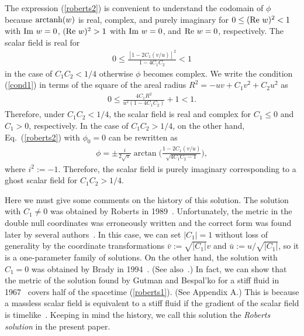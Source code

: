 \documentclass[aps,prd,twocolumn,eqsecnum,showpacs,amsmath]{revtex4}
\begin{document}
The expression (\ref{roberts2}) is convenient to understand the codomain of $\phi$ because ${\rm arctanh}(w)$ is real, complex, and purely imaginary for $0 \le ({\rm Re}~w)^2<1$ with ${\rm Im}~w=0$, $({\rm Re}~w)^2>1$ with ${\rm Im}~w=0$, and ${\rm Re}~w=0$, respectively.
The scalar field is real for 
\begin{eqnarray}
0 \le \frac{[1-2C_1(v/u)]^2}{1-4C_1C_2}<1 \label{cond1}
\end{eqnarray}
in the case of $C_1C_2<1/4$ otherwise $\phi$ becomes complex.
We write the condition (\ref{cond1}) in terms of the square of the areal radius $R^2=-uv+C_1v^2+C_2u^2$ as
\begin{eqnarray}
0 \le \frac{4C_1R^2}{u^2(1-4C_1C_2)}+1<1.
\end{eqnarray}
Therefore, under $C_1C_2<1/4$, the scalar field is real and complex for $C_1 \le 0$ and $C_1>0$, respectively.
In the case of $C_1C_2>1/4$, on the other hand, Eq.~(\ref{roberts2}) with $\phi_0=0$ can be rewritten as
\begin{eqnarray}
\phi=\pm \frac{i}{2\sqrt{\pi}}\arctan\biggl(\frac{1-2C_1(v/u)}{\sqrt{4C_1C_2-1}}\biggl), \label{roberts-c}
\end{eqnarray}
where $i^2:=-1$.
Therefore, the scalar field is purely imaginary corresponding to a ghost scalar field for $C_1C_2>1/4$.



Here we must give some comments on the history of this solution.
The solution with $C_1 \ne 0$ was obtained by Roberts in 1989~\cite{roberts1989}.
Unfortunately, the metric in the double null coordinates was erroneously written and the correct form was found later by several authors~\cite{sussman1991,ont1994,brady1994,burko1997}.
In this case, we can set $|C_1|=1$ without loss of generality by the coordinate transformations ${\bar v}:=\sqrt{|C_1|}v$ and ${\bar u}:=u/\sqrt{|C_1|}$, so it is a one-parameter family of solutions.
On the other hand, the solution with $C_1=0$ was obtained by Brady in 1994~\cite{brady1994}. (See also~\cite{hayward2000,ch2001}.)
In fact, we can show that the metric of the solution found by Gutman and Bespal'ko for a stiff fluid in 1967~\cite{gb1967} covers half of the spacetime (\ref{roberts1}). 
(See Appendix A.)
This is because a massless scalar field is equivalent to a stiff fluid if the gradient of the scalar field is timelike~\cite{madsen1988}. 
Keeping in mind the history, we call this solution the {\it Roberts solution} in the present paper.
\end{document}
